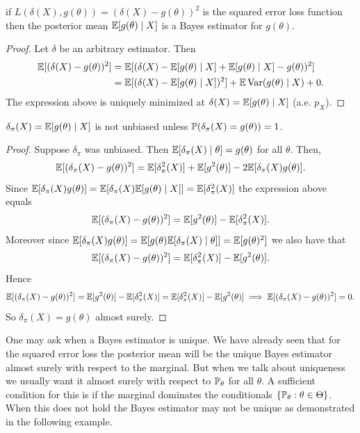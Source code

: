 \begin{theorem}
if $L(\delta(X), g(\theta)) = (\delta(X) - g(\theta))^2$ is the squared error loss function then the posterior mean $\mathbb{E}[g(\theta) \mid X]$ is a Bayes estimator for $g(\theta)$.
\end{theorem}

\begin{proof}
	Let $\delta$ be an arbitrary estimator. Then 
	\begin{align*}
	\mathbb{E}[(\delta(X) - g(\theta))^2] &= \mathbb{E}[(\delta(X) - \mathbb{E}[g(\theta) \mid X] + \mathbb{E}[g(\theta) \mid X] - g(\theta))^2] \\
	&=  \mathbb{E}[(\delta(X) - \mathbb{E}[g(\theta) \mid X])^2] + \mathbb{E} \operatorname{Var}(g(\theta) \mid X) + 0.
	\end{align*}
	The expression above is uniquely minimized at $\delta(X) = \mathbb{E}[g(\theta) \mid X]$ (a.e. $p_X$).
\end{proof}

\begin{proposition}
	$\delta_\pi(X) = \mathbb{E}[g(\theta) \mid X]$ is not unbiased unless $\mathbb{P}(\delta_\pi(X) = g(\theta)) = 1$.
\end{proposition}

\begin{proof}
	Suppose $\delta_\pi$ was unbiased. Then $\mathbb{E}[\delta_\pi(X) \mid \theta] = g(\theta)$ for all $\theta$. Then, \[
		\mathbb{E}[(\delta_\pi(X) - g(\theta))^2] = \mathbb{E}[\delta_\pi^2(X)] + \mathbb{E}[g^2(\theta)] - 2\mathbb{E}[\delta_\pi(X) g(\theta)].
	\] Since $\mathbb{E}[\delta_\pi(X) g(\theta)] = \mathbb{E}[\delta_\pi(X) \mathbb{E}[g(\theta) \mid X]] = \mathbb{E}[\delta_\pi^2(X)]$ the expression above equals \[
		\mathbb{E}[(\delta_\pi(X) - g(\theta))^2] = \mathbb{E}[g^2(\theta)] -  \mathbb{E}[\delta_\pi^2(X)].
	\] Moreover since $\mathbb{E}[\delta_\pi(X) g(\theta)] = \mathbb{E}[g(\theta) \mathbb{E}[\delta_\pi(X) \mid \theta]] = \mathbb{E}[g(\theta)^2]$ we also have that \[
		\mathbb{E}[(\delta_\pi(X) - g(\theta))^2] = \mathbb{E}[\delta_\pi^2(X)] - \mathbb{E}[g^2(\theta)].
	\] Hence \[
		\mathbb{E}[(\delta_\pi(X) - g(\theta))^2]  = \mathbb{E}[g^2(\theta)] -  \mathbb{E}[\delta_\pi^2(X)] = \mathbb{E}[\delta_\pi^2(X)] - \mathbb{E}[g^2(\theta)] \implies \mathbb{E}[(\delta_\pi(X) - g(\theta))^2]  = 0.
	\]
	So $\delta_\pi(X) = g(\theta)$ almost surely.
\end{proof}

\noindent One may ask when a Bayes estimator is unique. We have already seen that for the squared error loss the posterior mean will be the unique Bayes estimator almost surely with respect to the marginal. But when we talk about uniqueness we usually want it almost surely with respect to $\mathbb{P}_\theta$ for all $\theta$. A sufficient condition for this is if the marginal dominates the conditionals $\{\mathbb{P}_\theta : \theta \in \Theta \}$. When this does not hold the Bayes estimator may not be unique as demonstrated in the following example.

